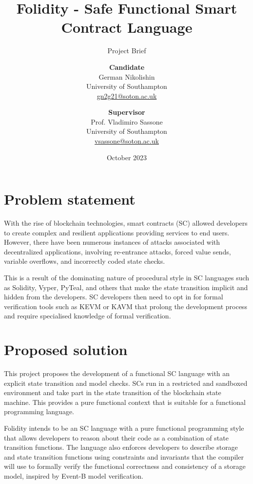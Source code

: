 \documentclass[10pt, a4paper]{article}
\title{Folidity - Safe Functional Smart Contract Language}
\subtitle{Project Brief}
\author{
  \textbf{Candidate}\\
  German Nikolishin\\
  University of Southampton\\
  \href{mailto:gn2g21@soton.ac.uk}{gn2g21@soton.ac.uk}
  \and
  \textbf{Supervisor}\\
  Prof. Vladimiro Sassone\\
  University of Southampton\\
  \href{mailto:vsassone@soton.ac.uk}{vsassone@soton.ac.uk}
}
\date{October 2023}
\begin{document}
\maketitle
\thispagestyle{empty}



\section*{Problem statement}
\paragraph{}
With the rise of blockchain technologies, smart contracts (SC) allowed developers to create complex and resilient applications providing services to end users. However, there have been numerous instances of attacks associated with decentralized applications, involving re-entrance attacks, forced value sends, variable overflows, and incorrectly coded state checks.

This is a result of the dominating nature of procedural style in SC languages such as Solidity, Vyper, PyTeal, and others that make the state transition implicit and hidden from the developers. SC developers then need to opt in for formal verification tools such as KEVM or KAVM that prolong the development process and require specialised knowledge of formal verification.

\section*{Proposed solution}
\paragraph{}
This project proposes the development of a functional SC language with an explicit state transition and model checks. SCs run in a restricted and sandboxed environment and take part in the state transition of the blockchain state machine. This provides a pure functional context that is suitable for a functional programming language. 

Folidity intends to be an SC language with a pure functional programming style that allows developers to reason about their code as a combination of state transition functions. The language also enforces developers to describe storage and state transition functions using constraints and invariants that the compiler will use to formally verify the functional correctness and consistency of a storage model, inspired by Event-B model verification.
\end{document}
